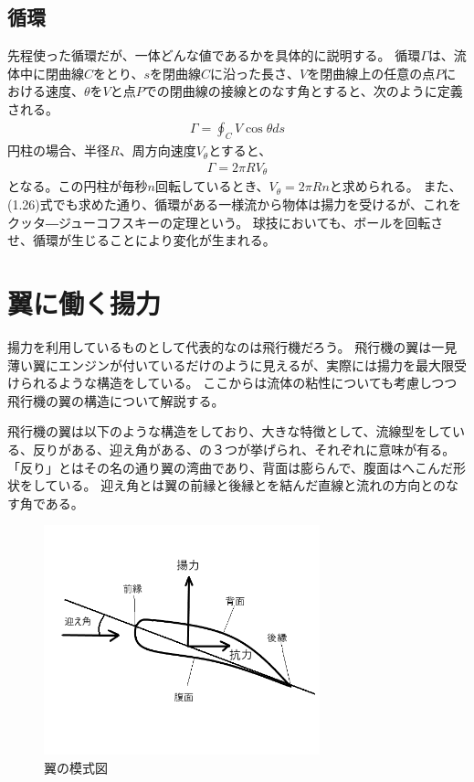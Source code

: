 \documentclass[10pt,b5paper,papersize,dvipdfmx]{jsbook}
\begin{document}
\subsection{循環}
先程使った循環だが、一体どんな値であるかを具体的に説明する。
循環$\Gamma$は、流体中に閉曲線$C$をとり、$s$を閉曲線$C$に沿った長さ、$V$を閉曲線上の任意の点$P$における速度、$\theta$を$V$と点$P$での閉曲線の接線とのなす角とすると、次のように定義される。
\begin{align}
  \Gamma = \oint_C V\cos\theta ds
\end{align}
円柱の場合、半径$R$、周方向速度$V_\theta$とすると、
\begin{align}
  \Gamma = 2\pi RV_\theta
\end{align}
となる。この円柱が毎秒$n$回転しているとき、$V_\theta = 2\pi Rn$と求められる。
また、(1.26)式でも求めた通り、循環がある一様流から物体は揚力を受けるが、これをクッタ―ジューコフスキーの定理という。
球技においても、ボールを回転させ、循環が生じることにより変化が生まれる。
\section{翼に働く揚力}
揚力を利用しているものとして代表的なのは飛行機だろう。
飛行機の翼は一見薄い翼にエンジンが付いているだけのように見えるが、実際には揚力を最大限受けられるような構造をしている。
ここからは流体の粘性についても考慮しつつ飛行機の翼の構造について解説する。
\par
飛行機の翼は以下のような構造をしており、大きな特徴として、流線型をしている、反りがある、迎え角がある、の３つが挙げられ、それぞれに意味が有る。
「反り」とはその名の通り翼の湾曲であり、背面は膨らんで、腹面はへこんだ形状をしている。
迎え角とは翼の前縁と後縁とを結んだ直線と流れの方向とのなす角である。
\begin{figure}[ht]
  \centering
  \includegraphics[width=80mm]{img/ryuutai4.png}
  \caption{翼の模式図}
\end{figure}
\end{document}
